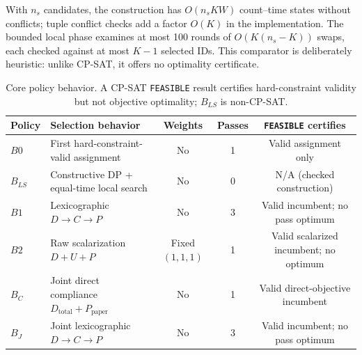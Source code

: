 \documentclass[runningheads]{llncs}
\begin{document}
With $n_s$ candidates, the construction has $O(n_s K W)$ count--time states without conflicts; tuple conflict checks add a factor $O(K)$ in the implementation. The bounded local phase examines at most 100 rounds of $O(K(n_s-K))$ swaps, each checked against at most $K-1$ selected IDs. This comparator is deliberately heuristic: unlike CP-SAT, it offers no optimality certificate.

\begin{table}[t]
\caption{Core policy behavior. A CP-SAT \texttt{FEASIBLE} result certifies hard-constraint validity but not objective optimality; $B_{LS}$ is non-CP-SAT.}
\label{tab:policy_behavior}
\centering
\scriptsize
\begin{tabular}{@{}lp{3.5cm}ccc@{}}
\toprule
Policy & Selection behavior & Weights & Passes & \texttt{FEASIBLE} certifies \\
\midrule
$B0$ & First hard-constraint-valid assignment & No & 1 & Valid assignment only \\
$B_{LS}$ & Constructive DP + equal-time local search & No & 0 & N/A (checked construction) \\
$B1$ & Lexicographic $D\to C\to P$ & No & 3 & Valid incumbent; no pass optimum \\
$B2$ & Raw scalarization $D+U+P$ & Fixed $(1,1,1)$ & 1 & Valid scalarized incumbent; no optimum \\
$B_C$ & Joint direct compliance $D_{\mathrm{total}}+P_{\mathrm{paper}}$ & No & 1 & Valid direct-objective incumbent \\
$B_J$ & Joint lexicographic $D\to C\to P$ & No & 3 & Valid incumbent; no pass optimum \\
\bottomrule
\end{tabular}
\end{table}
\end{document}
